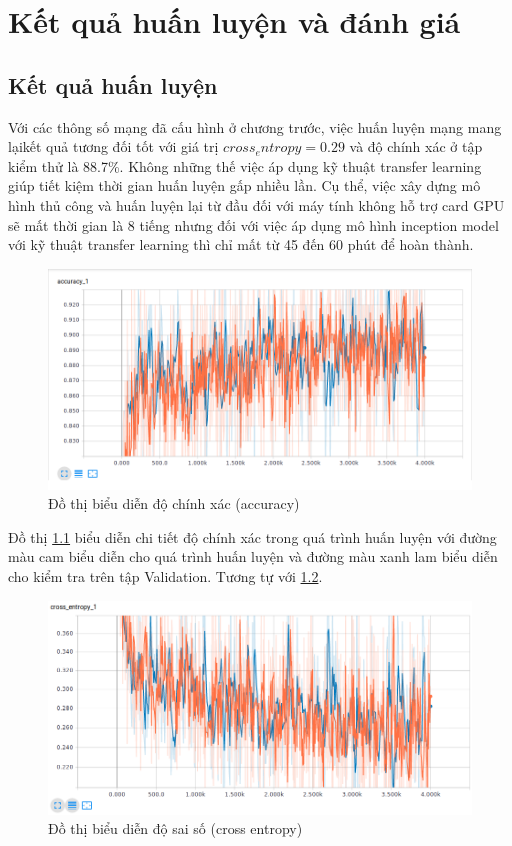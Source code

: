 \chapter{Kết quả huấn luyện và đánh giá}
\section{Kết quả huấn luyện}
Với các thông số mạng đã cấu hình ở chương trước, việc huấn luyện mạng mang lạikết quả tương đối tốt với giá trị \(cross_entropy = 0.29\) và độ chính xác ở tập kiểm thử là 88.7\%. Không những thế việc áp dụng kỹ thuật transfer learning giúp tiết kiệm thời gian huấn luyện gấp nhiều lần. Cụ thể, việc xây dựng mô hình thủ công và huấn luyện lại từ đầu đối với máy tính không hỗ trợ card GPU sẽ mất thời gian là 8 tiếng nhưng đối với việc áp dụng mô hình inception model với kỹ thuật transfer learning thì chỉ mất từ 45 đến 60 phút để hoàn thành.\par

\pagebreak
	\begin{figure}[h!]
		\centering
		\includegraphics[scale=0.5]{charts/accuracy.png}
		\caption{Đồ thị biểu diễn độ chính xác (accuracy)}
		\label{fig:accuracy}
	\end{figure}

Đồ thị \ref{fig:accuracy} biểu diễn chi tiết độ chính xác trong quá trình huấn luyện với đường màu cam biểu diễn cho quá trình huấn luyện và đường màu xanh lam biểu diễn cho kiểm tra trên tập Validation. Tương tự với \ref{fig:cross_entropy}.
	\pagebreak
	\begin{figure}[h!]
		\centering
		\includegraphics[scale=0.5]{charts/cross-entropy.png}
		\caption{Đồ thị biểu diễn độ sai số (cross entropy)}
		\label{fig:cross_entropy}
	\end{figure}

